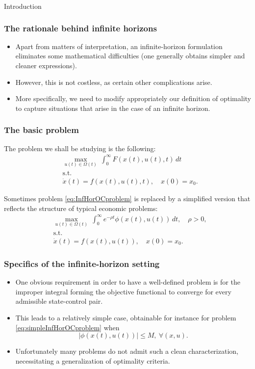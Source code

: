 \documentclass[10pt]{beamer}
\theoremstyle{definition}
\begin{document}
\begin{section}{Introduction}
\begin{frame}[fragile]
\frametitle{The rationale behind infinite horizons}
\begin{itemize}\itemsep1em
\item Apart from matters of interpretation, an infinite-horizon formulation eliminates some mathematical difficulties (one generally obtains simpler and cleaner expressions).
\item However, this is not costless, as certain other complications arise.
\item More specifically, we need to modify appropriately our definition of optimality to capture situations that arise in the case of an infinite horizon.
\end{itemize}
\end{frame}

\begin{frame}[fragile]
\frametitle{The basic problem}
The problem we shall be studying is the following:
\begin{equation}\begin{split}
&\max_{u(t)\in \Omega(t)}~\int_{0}^{\infty}F(x(t),u(t),t)\,dt\\
&\text{s.t.}\\
&\dot{x}(t)=f(x(t),u(t),t),\quad x(0)=x_0.
\end{split}
\label{eq:InfHorOCproblem}
\end{equation}

Sometimes problem \eqref{eq:InfHorOCproblem} is replaced by a simplified version that reflects the structure of typical economic problems:
\begin{equation}\begin{split}
&\max_{u(t)\in \Omega(t)}~\int_{0}^{\infty}e^{-\rho t} \phi(x(t),u(t))\,dt, \quad \rho>0,\\
&\text{s.t.}\\
&\dot{x}(t)=f(x(t),u(t)),\quad x(0)=x_0.
\end{split}
\label{eq:simpleInfHorOCproblem}
\end{equation}
\end{frame}

\begin{frame}[fragile]
\frametitle{Specifics of the infinite-horizon setting}
\begin{itemize}\itemsep1em
\item One obvious requirement in order to have a well-defined problem is for the improper integral forming the objective functional to converge for every admissible state-control pair.
\item This leads to a relatively simple case, obtainable for instance for problem \eqref{eq:simpleInfHorOCproblem} when \[ |\phi(x(t),u(t))|\leq M,~\forall (x,u). \]
\item Unfortunately many problems do not admit such a clean characterization, necessitating a generalization of optimality criteria.
\end{itemize}
\end{frame}


\end{section}
\end{document}
